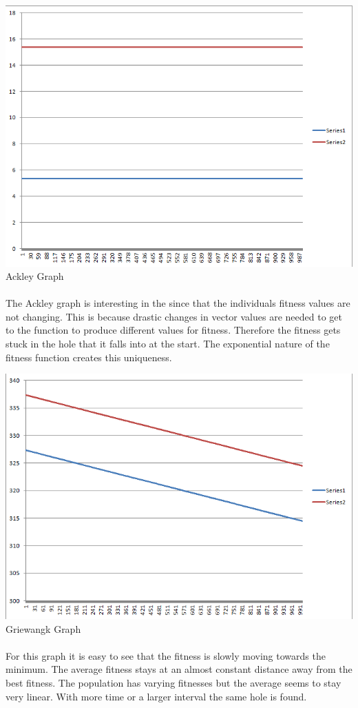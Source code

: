 \documentclass[paper=a4, fontsize=11pt]{scrartcl} %
\numberwithin{equation}{section} %
\numberwithin{figure}{section} %
\numberwithin{table}{section} %
\begin{document}
\includegraphics{Ackley}
Ackley Graph

\paragraph{} The Ackley graph is interesting in the since that the individuals fitness values are not changing. This is because drastic changes in vector values are needed to get to the function to produce different values for fitness. Therefore the fitness gets stuck in the hole that it falls into at the start. The exponential nature of the fitness function creates this uniqueness.

\includegraphics{Griewangk}
Griewangk Graph

\paragraph{} For this graph it is easy to see that the fitness is slowly moving towards the minimum. The average fitness stays at an almost constant distance away from the best fitness. The population has varying fitnesses but the average seems to stay very linear. With more time or a larger interval the same hole is found.
\end{document}
